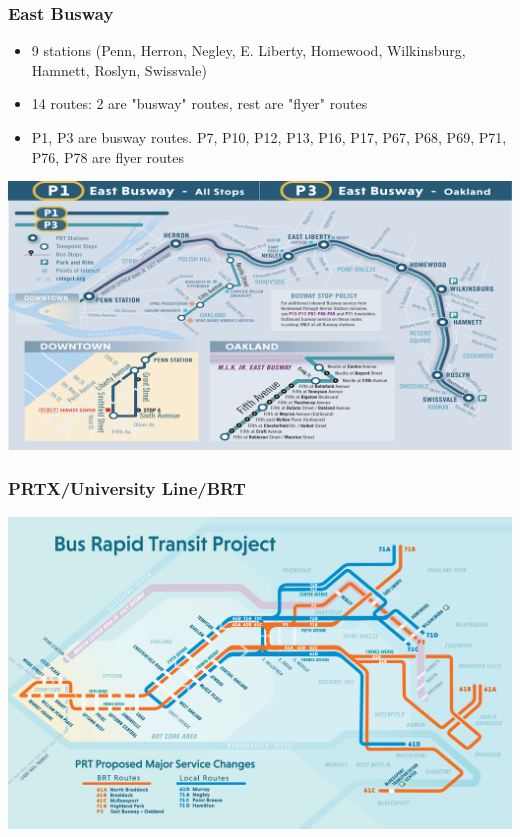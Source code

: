 \documentclass{beamer}
\begin{document}
\begin{frame}
\frametitle{East Busway}
\begin{itemize}
    \item 9 stations (Penn, Herron, Negley, E. Liberty, Homewood, Wilkinsburg, Hamnett, Roslyn, Swissvale)
    \item 14 routes: 2 are "busway" routes, rest are "flyer" routes 
    \item P1, P3 are busway routes. P7, P10, P12, P13, P16, P17, P67, P68, P69, P71, P76, P78 are flyer routes
\end{itemize}
\end{frame}

\begin{frame}
\includegraphics[width=\textwidth]{img/eastbusway.png}
\end{frame}

\begin{frame}
\frametitle{PRTX/University Line/BRT}
\includegraphics[width=\textwidth]{img/brtmap.png}
\end{frame}
\end{document}
